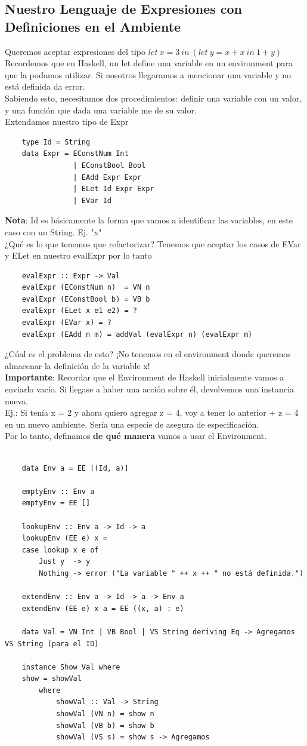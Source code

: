 \documentclass[10pt,a4paper]{article}
\begin{document}
\subsection*{Nuestro Lenguaje de Expresiones con Definiciones en el Ambiente}
Queremos aceptar expresiones del tipo $let \ x=3 \ in \ (let \ y = x+x \ in \ 1+y)$ \\
Recordemos que en Haskell, un let define una variable en un environment para que la podamos utilizar. Si nosotros llegaramos a mencionar una variable y no está definida da error. \\
Sabiendo esto, necesitamos dos procedimientos: definir una variable con un valor, y una función que dada una variable me de su valor. \\
Extendamos nuestro tipo de Expr 
\begin{lstlisting}
    type Id = String 
    data Expr = EConstNum Int 
                | EConstBool Bool 
                | EAdd Expr Expr  
                | ELet Id Expr Expr 
                | EVar Id
\end{lstlisting}
\textbf{Nota}: Id es básicamente la forma que vamos a identificar las variables, en este caso con un String. Ej. "x" \\
¿Qué es lo que tenemos que refactorizar? Tenemos que aceptar los casos de EVar y ELet en nuestro evalExpr por lo tanto 
\begin{lstlisting}
    evalExpr :: Expr -> Val
    evalExpr (EConstNum n)  = VN n
    evalExpr (EConstBool b) = VB b
    evalExpr (ELet x e1 e2) = ?
    evalExpr (EVar x) = ?
    evalExpr (EAdd n m) = addVal (evalExpr n) (evalExpr m)
\end{lstlisting}
¿Cúal es el problema de esto? ¡No tenemos en el environment donde queremos almacenar la definición de la variable x! \\
\textbf{Importante}: Recordar que el Environment de Haskell inicialmente vamos a enviarlo vacío. Si llegase a haber una acción sobre él, devolvemos una instancia nueva. \\
Ej.: Si tenía x = 2 y ahora quiero agregar z = 4, voy a tener lo anterior + z = 4 en un nuevo ambiente. Sería una especie de asegura de especificación. \\
Por lo tanto, definamos \textbf{de qué manera} vamos a usar el Environment. 
\begin{lstlisting}
    
    data Env a = EE [(Id, a)]

    emptyEnv :: Env a
    emptyEnv = EE []

    lookupEnv :: Env a -> Id -> a
    lookupEnv (EE e) x = 
    case lookup x e of
        Just y  -> y
        Nothing -> error ("La variable " ++ x ++ " no está definida.")

    extendEnv :: Env a -> Id -> a -> Env a
    extendEnv (EE e) x a = EE ((x, a) : e)

    data Val = VN Int | VB Bool | VS String deriving Eq -> Agregamos VS String (para el ID)

    instance Show Val where 
    show = showVal 
        where 
            showVal :: Val -> String 
            showVal (VN n) = show n
            showVal (VB b) = show b
            showVal (VS s) = show s -> Agregamos
\end{lstlisting}
\end{document}
